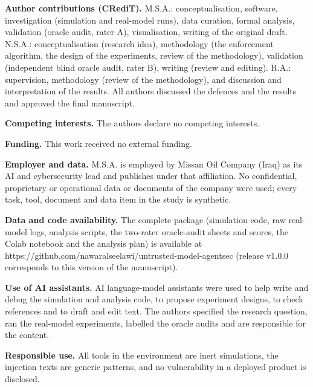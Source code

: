 \documentclass[11pt]{article}
\begin{document}
\textbf{Author contributions (CRediT).} M.S.A.: conceptualisation, software, investigation (simulation and real-model runs), data curation, formal analysis, validation (oracle audit, rater A), visualisation, writing of the original draft. N.S.A.: conceptualisation (research idea), methodology (the enforcement algorithm, the design of the experiments, review of the methodology), validation (independent blind oracle audit, rater B), writing (review and editing). R.A.: supervision, methodology (review of the methodology), and discussion and interpretation of the results. All authors discussed the defences and the results and approved the final manuscript.

\textbf{Competing interests.} The authors declare no competing interests.

\textbf{Funding.} This work received no external funding.

\textbf{Employer and data.} M.S.A. is employed by Missan Oil Company (Iraq) as its AI and cybersecurity lead and publishes under that affiliation. No confidential, proprietary or operational data or documents of the company were used; every task, tool, document and data item in the study is synthetic.

\textbf{Data and code availability.} The complete package (simulation code, raw real-model logs, analysis scripts, the two-rater oracle-audit sheets and scores, the Colab notebook and the analysis plan) is available at https://github.com/nawaralseelawi/untrusted-model-agentsec (release v1.0.0 corresponds to this version of the manuscript).

\textbf{Use of AI assistants.} AI language-model assistants were used to help write and debug the simulation and analysis code, to propose experiment designs, to check references and to draft and edit text. The authors specified the research question, ran the real-model experiments, labelled the oracle audits and are responsible for the content.

\textbf{Responsible use.} All tools in the environment are inert simulations, the injection texts are generic patterns, and no vulnerability in a deployed product is disclosed.



\end{document}
